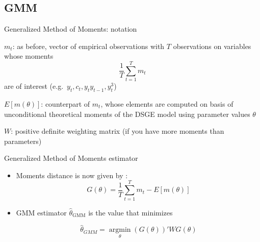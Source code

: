 \subsection{GMM}


\begin{frame}{Generalized Method of Moments: notation}
  \begin{witemize}
    \item $m_t$: as before, vector of empirical observations with $T$ observations on variables whose moments
    \begin{equation}
      \frac{1}{T} \sum_{t=1}^{T} m_t
    \end{equation}
    are of interest (e.g.\ $ y_t, c_t, y_{t}y_{t-1}, y_t^3 $)
    \item $E[m(\theta)]$: counterpart of \( m_t \), whose elements are computed on basis of unconditional theoretical moments of the DSGE model using parameter values $ \theta $
    \item $W$: positive definite weighting matrix (if you have more moments than parameters)
  \end{witemize}

\end{frame}


\begin{frame}{Generalized Method of Moments estimator}
  \begin{itemize}
    \item  Moments distance is now given by :
          \begin{equation}
            G(\theta) = \frac{1}{T} \sum_{t=1}^{T} m_t - E[m(\theta)]
          \end{equation}

    \item GMM estimator $\hat{\theta}_{\text{GMM}}$ is the value that minimizes

          \begin{equation}
            {\hat \theta _{GMM}} = \mathop {\text{argmin}}\limits_\theta  \left( {G\left( \theta  \right)} \right)'WG\left( \theta  \right)
          \end{equation}

  \end{itemize}
\end{frame}

